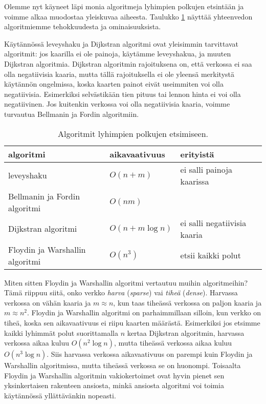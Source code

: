 Olemme nyt käyneet läpi monia algoritmeja
lyhimpien polkujen etsintään ja voimme alkaa
muodostaa yleiskuvaa aiheesta.
Taulukko \ref{tab:reiver} näyttää yhteenvedon
algoritmiemme tehokkuudesta ja ominaisuuksista.

Käytännössä leveyshaku ja Dijkstran algoritmi ovat
yleisimmin tarvittavat algoritmit:
jos kaarilla ei ole painoja, käytämme leveyshakua,
ja muuten Dijkstran algoritmia.
Dijkstran algoritmin rajoituksena on,
että verkossa ei saa olla negatiivisia kaaria,
mutta tällä rajoituksella ei ole yleensä merkitystä
käytännön ongelmissa, koska kaarten painot eivät
useimmiten voi olla negatiivisia.
Esimerkiksi selvästikään tien pituus tai lennon hinta
ei voi olla negatiivinen.
Jos kuitenkin verkossa voi olla negatiivisia kaaria,
voimme turvautua Bellmanin ja Fordin algoritmiin.

\begin{table}
\center
\begin{tabular}{lll}
algoritmi & aikavaativuus & erityistä \\
\hline
leveyshaku & $O(n+m)$ & ei salli painoja kaarissa \\
Bellmanin ja Fordin algoritmi & $O(nm)$ & \\
Dijkstran algoritmi & $O(n+m \log n)$ & ei salli negatiivisia kaaria \\
Floydin ja Warshallin algoritmi & $O(n^3)$ & etsii kaikki polut \\
\end{tabular}
\caption{Algoritmit lyhimpien polkujen etsimiseen.}
\label{tab:reiver}
\end{table}


Miten sitten Floydin ja Warshallin algoritmi vertautuu muihin algoritmeihin?
Tämä riippuu siitä, onko verkko \emph{harva} (\emph{sparse}) vai
\emph{tiheä} (\emph{dense}).
Harvassa verkossa on vähän kaaria ja $m \approx n$,
kun taas tiheässä verkossa on paljon kaaria ja $m \approx n^2$.
Floydin ja Warshallin algoritmi on parhaimmillaan silloin,
kun verkko on tiheä, koska sen aikavaativuus ei riipu
kaarten määrästä.
Esimerkiksi jos etsimme kaikki lyhimmät polut
suorittamalla $n$ kertaa Dijkstran algoritmin,
harvassa verkossa aikaa kuluu $O(n^2 \log n)$,
mutta tiheässä verkossa aikaa kuluu $O(n^3 \log n)$.
Siis harvassa verkossa aikavaativuus on parempi
kuin Floydin ja Warshallin algoritmissa,
mutta tiheässä verkossa se on huonompi.
Toisaalta Floydin ja Warshallin algoritmin vakiokertoimet
ovat hyvin pienet sen yksinkertaisen rakenteen ansiosta,
minkä ansiosta algoritmi voi toimia käytännössä
yllättävänkin nopeasti.
